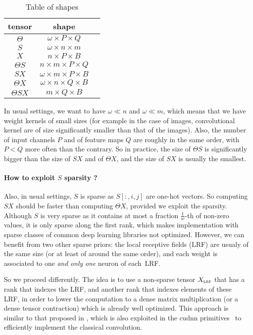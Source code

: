\begin{table}[H]
  \centering
\begin{tabular}{ccc}
  tensor & shape\\
  \hline
  $\Theta$ & $\omega \times P \times Q$\\
  $S$ & $\omega \times n \times m$\\
  $X$ & $n \times P \times B$\\
  $\Theta S$ & $n \times m \times P \times Q$\\
  $SX$ & $\omega \times m \times P \times B$\\
  $\Theta X$ & $\omega \times n \times Q \times B$\\
  $\Theta SX$ & $m \times Q \times B$
\end{tabular}
\caption{Table of shapes}
\label{tab:mid}
\end{table}

In usual settings, we want to have $\omega \ll n$ and $\omega \ll m$, which means that we have weight kernels of small sizes (for example in the case of images, convolutional kernel are of size significantly smaller than that of the images). Also, the number of input channels $P$ and of feature maps $Q$ are roughly in the same order, with $P < Q$ more often than the contrary. So in practice, the size of $\Theta S$ is significantly bigger than the size of $SX$ and of $\Theta X$, and the size of $SX$ is usually the smallest.

\paragraph{How to exploit $S$ sparsity ?}
Also, in usual settings, $S$ is sparse as $S[:,i,j]$ are one-hot vectors. So computing $SX$ should be faster than computing $\Theta X$, provided we exploit the sparsity. Although $S$ is very sparse as it contains at most a fraction $\frac{1}{w}$-th of non-zero values, it is only sparse along the first rank, which makes implementation with sparse classes of common deep learning libraries not optimized. However, we can benefit from two other sparse priors: the local receptive fields (LRF) are usualy of the same size (or at least of around the same order), and each weight is associated to one \emph{and only one} neuron of each~LRF.

So we proceed differently. The idea is to use a non-sparse tensor $X_{\operatorname{\textsc{lrf}}}$ that has a rank that indexes the LRF, and another rank that indexes elements of these LRF, in order to lower the computation to a dense matrix multiplication (or a dense tensor contraction) which is already well optimized. This approach is similar to that proposed in \cite{chellapilla2006high}, which is also exploited in the cudnn primitives~\citep{chetlur2014cudnn} to efficiently implement the classical convolution.

